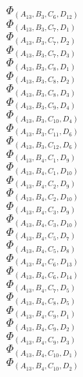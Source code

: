 \documentclass[14pt]{article}
\begin{document}
    $\Phi_{({A}_{13}, {B}_{3}, {C}_{6}, {D}_{12})}$ \\ 
    $\Phi_{({A}_{13}, {B}_{3}, {C}_{7}, {D}_{1})}$ \\ 
    $\Phi_{({A}_{13}, {B}_{3}, {C}_{7}, {D}_{2})}$ \\ 
    $\Phi_{({A}_{13}, {B}_{3}, {C}_{7}, {D}_{3})}$ \\ 
    $\Phi_{({A}_{13}, {B}_{3}, {C}_{8}, {D}_{1})}$ \\ 
    $\Phi_{({A}_{13}, {B}_{3}, {C}_{8}, {D}_{2})}$ \\ 
    $\Phi_{({A}_{13}, {B}_{3}, {C}_{8}, {D}_{3})}$ \\ 
    $\Phi_{({A}_{13}, {B}_{3}, {C}_{9}, {D}_{4})}$ \\ 
    $\Phi_{({A}_{13}, {B}_{3}, {C}_{10}, {D}_{4})}$ \\ 
    $\Phi_{({A}_{13}, {B}_{3}, {C}_{11}, {D}_{6})}$ \\ 
    $\Phi_{({A}_{13}, {B}_{3}, {C}_{12}, {D}_{6})}$ \\ 
    $\Phi_{({A}_{13}, {B}_{4}, {C}_{1}, {D}_{9})}$ \\ 
    $\Phi_{({A}_{13}, {B}_{4}, {C}_{1}, {D}_{10})}$ \\ 
    $\Phi_{({A}_{13}, {B}_{4}, {C}_{2}, {D}_{9})}$ \\ 
    $\Phi_{({A}_{13}, {B}_{4}, {C}_{2}, {D}_{10})}$ \\ 
    $\Phi_{({A}_{13}, {B}_{4}, {C}_{3}, {D}_{9})}$ \\ 
    $\Phi_{({A}_{13}, {B}_{4}, {C}_{3}, {D}_{10})}$ \\ 
    $\Phi_{({A}_{13}, {B}_{4}, {C}_{5}, {D}_{7})}$ \\ 
    $\Phi_{({A}_{13}, {B}_{4}, {C}_{5}, {D}_{8})}$ \\ 
    $\Phi_{({A}_{13}, {B}_{4}, {C}_{6}, {D}_{13})}$ \\ 
    $\Phi_{({A}_{13}, {B}_{4}, {C}_{6}, {D}_{14})}$ \\ 
    $\Phi_{({A}_{13}, {B}_{4}, {C}_{7}, {D}_{5})}$ \\ 
    $\Phi_{({A}_{13}, {B}_{4}, {C}_{8}, {D}_{5})}$ \\ 
    $\Phi_{({A}_{13}, {B}_{4}, {C}_{9}, {D}_{1})}$ \\ 
    $\Phi_{({A}_{13}, {B}_{4}, {C}_{9}, {D}_{2})}$ \\ 
    $\Phi_{({A}_{13}, {B}_{4}, {C}_{9}, {D}_{3})}$ \\ 
    $\Phi_{({A}_{13}, {B}_{4}, {C}_{10}, {D}_{1})}$ \\ 
    $\Phi_{({A}_{13}, {B}_{4}, {C}_{10}, {D}_{2})}$ \\ 
\end{document}
